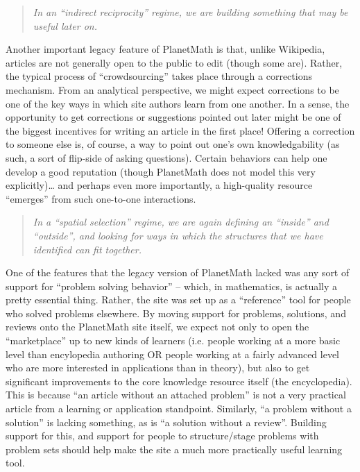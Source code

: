 \begin{quote}
\emph{In an ``indirect reciprocity'' regime, we are building something
that may be useful later on.}
\end{quote}
Another important legacy feature of PlanetMath is that, unlike
Wikipedia, articles are not generally open to the public to edit (though
some are). Rather, the typical process of ``crowdsourcing'' takes place
through a corrections mechanism. From an analytical perspective, we
might expect corrections to be one of the key ways in which site authors
learn from one another. In a sense, the opportunity to get corrections
or suggestions pointed out later might be one of the biggest incentives
for writing an article in the first place! Offering a correction to
someone else is, of course, a way to point out one's own knowledgability
(as such, a sort of flip-side of asking questions). Certain behaviors
can help one develop a good reputation (though PlanetMath does not model
this very explicitly)\ldots{} and perhaps even more importantly, a
high-quality resource ``emerges'' from such one-to-one interactions.

\begin{quote}
\emph{In a ``spatial selection'' regime, we are again defining an
``inside'' and ``outside'', and looking for ways in which the structures
that we have identified can fit together.}
\end{quote}
One of the features that the legacy version of PlanetMath lacked was any
sort of support for ``problem solving behavior'' -- which, in
mathematics, is actually a pretty essential thing. Rather, the site was
set up as a ``reference'' tool for people who solved problems elsewhere.
By moving support for problems, solutions, and reviews onto the
PlanetMath site itself, we expect not only to open the ``marketplace''
up to new kinds of learners (i.e. people working at a more basic level
than encylopedia authoring OR people working at a fairly advanced level
who are more interested in applications than in theory), but also to get
significant improvements to the core knowledge resource itself (the
encyclopedia). This is because ``an article without an attached
problem'' is not a very practical article from a learning or application
standpoint. Similarly, ``a problem without a solution'' is lacking
something, as is ``a solution without a review''. Building support for
this, and support for people to structure/stage problems with problem
sets should help make the site a much more practically useful learning
tool.

